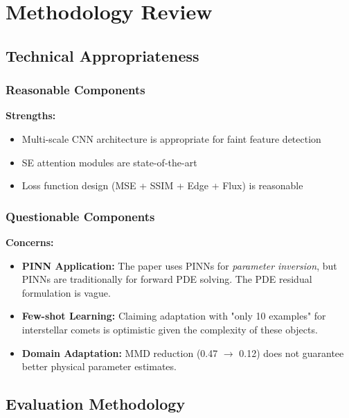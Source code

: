 \documentclass[12pt,a4paper]{article}
\newcommand{\warning}[1]{\textcolor{WarningOrange}{\textbf{#1}}}
\newcommand{\good}[1]{\textcolor{GoodGreen}{\textbf{#1}}}
\begin{document}
\section{Methodology Review}

\subsection{Technical Appropriateness}

\subsubsection{Reasonable Components}

\good{Strengths:}
\begin{itemize}
    \item Multi-scale CNN architecture is appropriate for faint feature detection
    \item SE attention modules are state-of-the-art
    \item Loss function design (MSE + SSIM + Edge + Flux) is reasonable
\end{itemize}

\subsubsection{Questionable Components}

\warning{Concerns:}
\begin{itemize}
    \item \textbf{PINN Application:} The paper uses PINNs for \textit{parameter inversion}, but PINNs are traditionally for forward PDE solving. The PDE residual formulation is vague.

    \item \textbf{Few-shot Learning:} Claiming adaptation with "only 10 examples" for interstellar comets is optimistic given the complexity of these objects.

    \item \textbf{Domain Adaptation:} MMD reduction (0.47 $\rightarrow$ 0.12) does not guarantee better physical parameter estimates.
\end{itemize}

\subsection{Evaluation Methodology}
\end{document}
